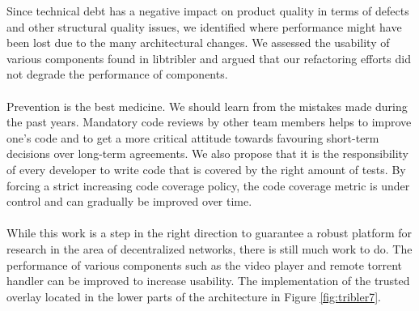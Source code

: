 Since technical debt has a negative impact on product quality in terms of defects and other structural quality issues, we identified where performance might have been lost due to the many architectural changes. We assessed the usability of various components found in libtribler and argued that our refactoring efforts did not degrade the performance of components.\\\\
Prevention is the best medicine. We should learn from the mistakes made during the past years. Mandatory code reviews by other team members helps to improve one's code and to get a more critical attitude towards favouring short-term decisions over long-term agreements. We also propose that it is the responsibility of every developer to write code that is covered by the right amount of tests. By forcing a strict increasing code coverage policy, the code coverage metric is under control and can gradually be improved over time.\\\\
While this work is a step in the right direction to guarantee a robust platform for research in the area of decentralized networks, there is still much work to do. The performance of various components such as the video player and remote torrent handler can be improved to increase usability. The implementation of the trusted overlay located in the lower parts of the architecture in Figure \ref{fig:tribler7}.

